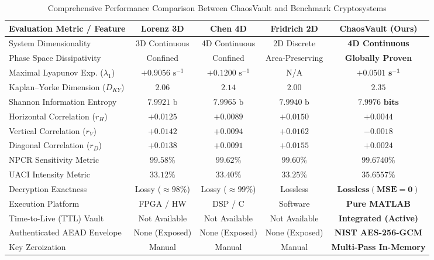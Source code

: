 \documentclass[12pt,a4paper,oneside]{report}
\begin{document}
\begin{table}[htbp]
\centering
\small
\caption{Comprehensive Performance Comparison Between ChaosVault and Benchmark Cryptosystems}
\label{tab:literature_comparison}
\begin{tabularx}{\textwidth}{@{} L{4.6cm} C C C C @{}}
\toprule
\textbf{Evaluation Metric / Feature} & \textbf{Lorenz 3D} \cite{pecora1990} & \textbf{Chen 4D} \cite{wu2011} & \textbf{Fridrich 2D} \cite{fridrich1998} & \textbf{ChaosVault (Ours)} \\
\midrule
System Dimensionality & 3D Continuous & 4D Continuous & 2D Discrete & \textbf{4D Continuous} \\
Phase Space Dissipativity & Confined & Confined & Area-Preserving & \textbf{Globally Proven} \\
Maximal Lyapunov Exp. ($\lambda_1$) & $+0.9056\text{ s}^{-1}$ & $+0.1200\text{ s}^{-1}$ & N/A & $\mathbf{+0.0501\text{ s}^{-1}}$ \\
Kaplan--Yorke Dimension ($D_{KY}$) & $2.06$ & $2.14$ & $2.00$ & $\mathbf{2.35}$ \\
Shannon Information Entropy & $7.9921\text{ b}$ & $7.9965\text{ b}$ & $7.9940\text{ b}$ & $\mathbf{7.9976\text{ bits}}$ \\
Horizontal Correlation ($r_H$) & $+0.0125$ & $+0.0089$ & $+0.0150$ & $\mathbf{+0.0044}$ \\
Vertical Correlation ($r_V$) & $+0.0142$ & $+0.0094$ & $+0.0162$ & $\mathbf{-0.0018}$ \\
Diagonal Correlation ($r_D$) & $+0.0138$ & $+0.0091$ & $+0.0155$ & $\mathbf{+0.0024}$ \\
NPCR Sensitivity Metric & $99.58\%$ & $99.62\%$ & $99.60\%$ & $\mathbf{99.6740\%}$ \\
UACI Intensity Metric & $33.12\%$ & $33.40\%$ & $33.25\%$ & $\mathbf{35.6557\%}$ \\
Decryption Exactness & Lossy ($\approx 98\%$) & Lossy ($\approx 99\%$) & Lossless & $\mathbf{Lossless (MSE=0)}$ \\
Execution Platform & FPGA / HW & DSP / C & Software & \textbf{Pure MATLAB} \\
Time-to-Live (TTL) Vault & Not Available & Not Available & Not Available & \textbf{Integrated (Active)} \\
Authenticated AEAD Envelope & None (Exposed) & None (Exposed) & None (Exposed) & \textbf{NIST AES-256-GCM} \\
Key Zeroization & Manual & Manual & Manual & \textbf{Multi-Pass In-Memory} \\
\bottomrule
\end{tabularx}
\end{table}
\end{document}

